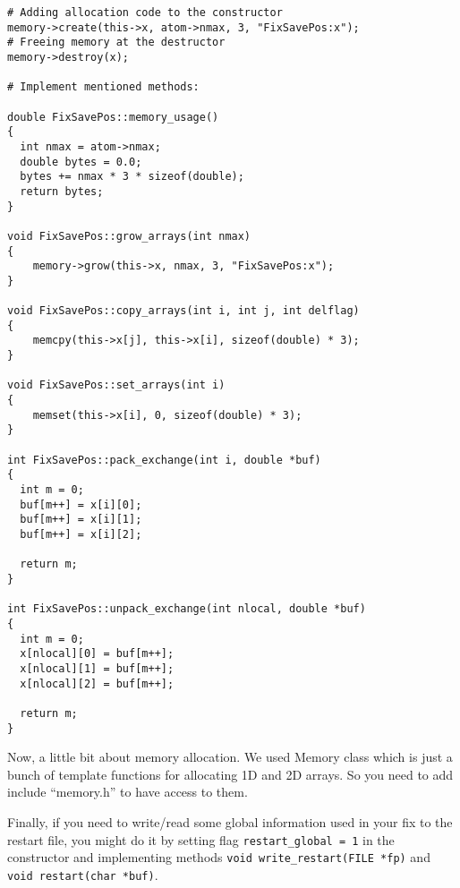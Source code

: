 \documentclass{article}
\newcommand{\code}[1]{{\color{cadetblue}\texttt{#1}}}
\begin{document}
\begin{center}
\begin{verbatim}
# Adding allocation code to the constructor
memory->create(this->x, atom->nmax, 3, "FixSavePos:x");
# Freeing memory at the destructor
memory->destroy(x);

# Implement mentioned methods:

double FixSavePos::memory_usage()
{
  int nmax = atom->nmax;
  double bytes = 0.0;
  bytes += nmax * 3 * sizeof(double);
  return bytes;
}

void FixSavePos::grow_arrays(int nmax)
{
    memory->grow(this->x, nmax, 3, "FixSavePos:x");
}

void FixSavePos::copy_arrays(int i, int j, int delflag)
{
    memcpy(this->x[j], this->x[i], sizeof(double) * 3);
}

void FixSavePos::set_arrays(int i)
{
    memset(this->x[i], 0, sizeof(double) * 3);
}

int FixSavePos::pack_exchange(int i, double *buf)
{
  int m = 0;
  buf[m++] = x[i][0];
  buf[m++] = x[i][1];
  buf[m++] = x[i][2];

  return m;
}

int FixSavePos::unpack_exchange(int nlocal, double *buf)
{
  int m = 0;
  x[nlocal][0] = buf[m++];
  x[nlocal][1] = buf[m++];
  x[nlocal][2] = buf[m++];

  return m;
}
\end{verbatim}
\end{center}

Now, a little bit about memory allocation. We used Memory class which
is just a bunch of template functions for allocating 1D and 2D
arrays. So you need to add include ``memory.h'' to have access to them.

Finally, if you need to write/read some global information used in your fix to
the restart file, you might do it by setting flag \code{restart\_global = 1} in
the constructor and implementing methods \texttt{void write\_restart(FILE *fp)} and \texttt{void restart(char *buf)}.
\end{document}
